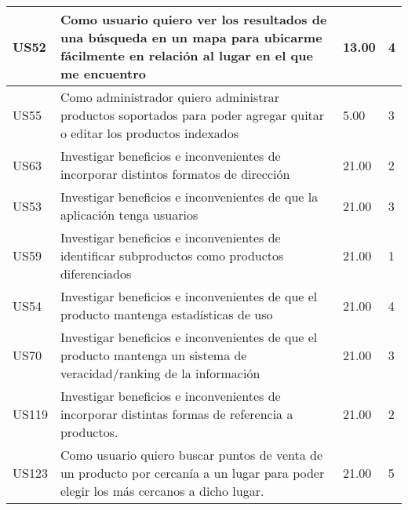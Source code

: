 \begin{tabular}{|p{1cm}|p{10cm}|p{1cm}|p{1cm}|}
\hline	
US52 &Como usuario quiero ver los resultados de una búsqueda en un mapa para ubicarme fácilmente en relación al lugar en el que me encuentro& 13.00&4\\ 
\hline
US55 &Como administrador quiero administrar productos soportados para poder agregar quitar o editar los productos indexados &5.00&3\\ 
\hline
US63 &Investigar beneficios e inconvenientes de incorporar distintos formatos de dirección &21.00&2\\ 
\hline
US53 &Investigar beneficios e inconvenientes de que la aplicación tenga usuarios& 21.00&3\\ 
\hline	
US59 &Investigar beneficios e inconvenientes de identificar subproductos como productos diferenciados &21.00&1\\ 
\hline		
US54 &Investigar beneficios e inconvenientes de que el producto mantenga estadísticas de uso &21.00&4\\ 
\hline	
US70 &Investigar beneficios e inconvenientes de que el producto mantenga un sistema de veracidad/ranking de la información &21.00&3\\ 	
\hline	
US119 &Investigar beneficios e inconvenientes de incorporar distintas formas de referencia a productos. &21.00&2\\ 
\hline		
US123 &Como usuario quiero buscar puntos de venta de un producto por cercanía a un lugar para poder elegir los más cercanos a dicho lugar. &21.00&5\\ 
\hline
\hline
\end{tabular}
\newpage

